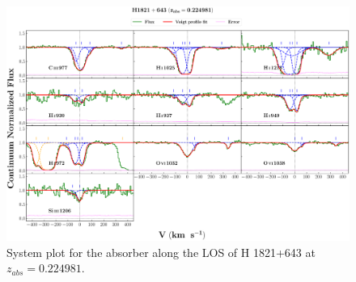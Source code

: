   \begin{landscape}
  
  \begin{figure}
      \centering
      \vspace{-10mm}
      \hspace*{-20mm}
      \includegraphics[width=1.1\linewidth]{System-Plots/H1821+643_z=0.224981_sys_plot.png}
      \caption{System plot for the absorber along the LOS of H 1821+643 at $z_{abs} = 0.224981$. }
  \end{figure}
  
  \end{landscape}
  
